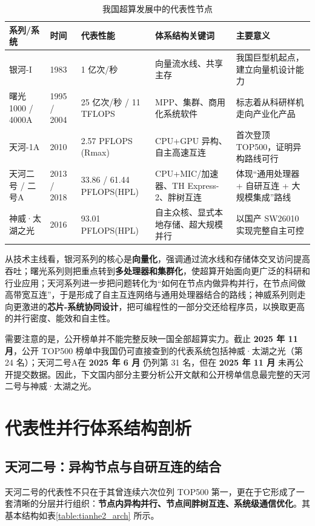 \documentclass[a4paper]{article}
\begin{document}
\begin{table}[htbp]
  \centering
  \small
  \begin{tabular}{p{1.8cm}p{2.2cm}p{1.8cm}p{4.1cm}p{3.1cm}}
  \toprule
  系列/系统 & 时间 & 代表性能 & 体系结构关键词 & 主要意义 \\
  \midrule
  银河-I & 1983 & 1 亿次/秒 & 向量流水线、共享主存 & 我国巨型机起点，建立向量机设计能力 \\
  曙光1000 / 4000A & 1995 / 2004 & 25 亿次/秒 / 11 TFLOPS & MPP、集群、商用化系统软件 & 标志着从科研样机走向产业化产品 \\
  天河-1A & 2010 & 2.57 PFLOPS (Rmax) & CPU+GPU 异构、自主高速互连 & 首次登顶 TOP500，证明异构路线可行 \\
  天河二号 / 二号A & 2013 / 2018 & \shortstack[l]{33.86 / 61.44\\PFLOPS(HPL)} & CPU+MIC/加速器、TH Express-2、胖树互连 & 体现“通用处理器 + 自研互连 + 大规模集成”路线 \\
  神威·太湖之光 & 2016 & \shortstack[l]{93.01\\PFLOPS(HPL)} & 自主众核、显式本地存储、超大规模并行 & 以国产 SW26010 实现完整自主可控 \\
  \bottomrule
  \end{tabular}
  \caption{我国超算发展中的代表性节点}
  \label{table:timeline}
\end{table}

从技术主线看，银河系列的核心是\textbf{向量化}，强调通过流水线和存储体交叉访问提高吞吐；曙光系列则把重点转到\textbf{多处理器和集群化}，使超算开始面向更广泛的科研和行业应用；天河系列进一步把问题转化为“如何在节点内做异构并行，在节点间做高带宽互连”，于是形成了自主互连网络与通用处理器结合的路线；神威系列则走向更激进的\textbf{芯片-系统协同设计}，把可编程性的一部分交还给程序员，以换取更高的并行密度、能效和自主性\cite{tianhe2_2013,sunway_taihulight,sunway_sw26010}。

需要注意的是，公开榜单并不能完整反映一国全部超算实力。截止 \textbf{2025 年 11 月}，公开 TOP500 榜单中我国仍可直接查到的代表系统包括神威·太湖之光（第 24 名）；天河二号A在 \textbf{2025 年 6 月} 仍列第 31 名，但在 \textbf{2025 年 11 月} 未再公开提交数据\cite{sunway_top500_2025,tianhe2a_top500_2025}。因此，下文国内部分主要分析公开文献和公开榜单信息最完整的天河二号与神威·太湖之光。

\section{代表性并行体系结构剖析}
\subsection{天河二号：异构节点与自研互连的结合}
天河二号的代表性不只在于其曾连续六次位列 TOP500 第一，更在于它形成了一套清晰的分层并行组织：\textbf{节点内异构并行、节点间胖树互连、系统级通信优化}。其基本结构如表\ref{table:tianhe2_arch} 所示。
\end{document}
